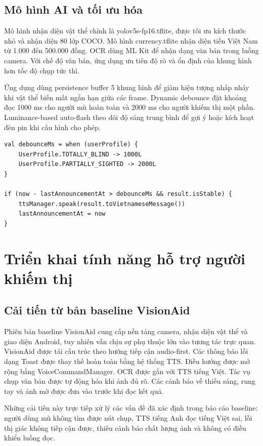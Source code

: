 \documentclass[a4paper,13pt]{report}
\begin{document}
\section{Mô hình AI và tối ưu hóa}

Mô hình nhận diện vật thể chính là yolov5s-fp16.tflite, được tối ưu kích thước nhỏ và nhận diện 80 lớp COCO. Mô hình currency.tflite nhận diện tiền Việt Nam từ 1.000 đến 500.000 đồng. OCR dùng ML Kit để nhận dạng văn bản trong luồng camera. Với chế độ văn bản, ứng dụng ưu tiên độ rõ và ổn định của khung hình hơn tốc độ chụp tức thì.

Ứng dụng dùng persistence buffer 5 khung hình để giảm hiện tượng nhấp nháy khi vật thể biến mất ngắn hạn giữa các frame. Dynamic debounce đặt khoảng đọc 1000 ms cho người mù hoàn toàn và 2000 ms cho người khiếm thị một phần. Luminance-based auto-flash theo dõi độ sáng trung bình để gợi ý hoặc kích hoạt đèn pin khi cấu hình cho phép.

\begin{lstlisting}[caption={Ví dụ logic debounce theo hồ sơ người dùng}]
val debounceMs = when (userProfile) {
    UserProfile.TOTALLY_BLIND -> 1000L
    UserProfile.PARTIALLY_SIGHTED -> 2000L
}

if (now - lastAnnouncementAt > debounceMs && result.isStable) {
    ttsManager.speak(result.toVietnameseMessage())
    lastAnnouncementAt = now
}
\end{lstlisting}

\chapter{Triển khai tính năng hỗ trợ người khiếm thị}

\section{Cải tiến từ bản baseline VisionAid}

Phiên bản baseline VisionAid cung cấp nền tảng camera, nhận diện vật thể và giao diện Android, tuy nhiên vẫn chịu sự phụ thuộc lớn vào tương tác trực quan. VisionAid được tái cấu trúc theo hướng tiếp cận audio-first. Các thông báo lỗi dạng Toast được thay thế hoàn toàn bằng hệ thống TTS. Điều hướng được mở rộng bằng VoiceCommandManager. OCR được gắn với TTS tiếng Việt. Tác vụ chụp văn bản được tự động hóa khi ảnh đủ rõ. Các cảnh báo về thiếu sáng, rung tay và ảnh mờ được đưa vào trước khi đọc kết quả.

Những cải tiến này trực tiếp xử lý các vấn đề đã xác định trong báo cáo baseline: người dùng mù không tìm được nút chụp, TTS tiếng Anh đọc tiếng Việt sai, lỗi thị giác không tiếp cận được, thiếu cảnh báo chất lượng ảnh và không có điều khiển luồng đọc.
\end{document}

